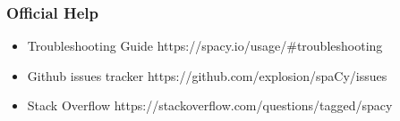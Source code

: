 \begin{frame}[fragile]\frametitle{Official Help}
  \begin{itemize}
    \item Troubleshooting Guide https://spacy.io/usage/\#troubleshooting
		\item Github issues tracker https://github.com/explosion/spaCy/issues
		\item Stack Overflow  https://stackoverflow.com/questions/tagged/spacy
  \end{itemize}


\end{frame}